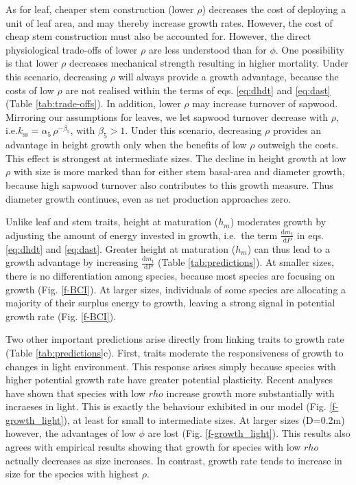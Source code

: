 \documentclass[12pt, a4paper]{article}
\begin{document}
As for leaf, cheaper stem construction (lower \(\rho\)) decreases the
cost of deploying a unit of leaf area, and may thereby increase growth
rates. However, the cost of cheap stem construction must also be
accounted for. However, the direct physiological trade-offs of lower
\(\rho\) are less understood than for \(\phi\). One possibility is that
lower \(\rho\) decreases mechanical strength resulting in higher
mortality\citep{chave_towards_2009,wright_functional_2010}. Under
this scenario, decreasing \(\rho\) will always provide a growth
advantage, because the costs of low \(\rho\) are not realised within the
terms of eqs. \ref{eq:dhdt} and \ref{eq:dast} (Table
\ref{tab:trade-offs}). In addition, lower \(\rho\) may increase turnover
of sapwood. Mirroring our assumptions for leaves, we let sapwood
turnover decrease with \(\rho\),
i.e.\(k_\textrm{ss}=\alpha_5 \, \rho^{-\beta_5}\), with \(\beta_5 > 1\).
Under this scenario, decreasing \(\rho\) provides an advantage in height
growth only when the benefits of low \(\rho\) outweigh the costs. This
effect is strongest at intermediate sizes. The decline in height growth
at low \(\rho\) with size is more marked than for either stem basal-area
and diameter growth, because high sapwood turnover also contributes to
this growth measure. Thus diameter growth continues, even as net
production approaches zero.

Unlike leaf and stem traits, height at maturation (\(h_m\)) moderates
growth by adjusting the amount of energy invested in growth, i.e.~the
term \(\frac{\textrm{d}m_\textrm{t}}{\textrm{d}P}\) in eqs.
\ref{eq:dhdt} and \ref{eq:dast}. Greater height at maturation (\(h_m\))
can thus lead to a growth advantage by increasing
\(\frac{\textrm{d}m_\textrm{t}}{\textrm{d}P}\) (Table
\ref{tab:predictions}). At smaller sizes, there is no differentiation
among species, because most species are focusing on growth (Fig.
\ref{f-BCI}). At larger sizes, individuals of some species are
allocating a majority of their surplus energy to growth, leaving a
strong signal in potential growth rate (Fig. \ref{f-BCI}).

Two other important predictions arise directly from linking traits to
growth rate (Table \ref{tab:predictions}c). First, traits moderate the
responsiveness of growth to changes in light environment. This response
arises simply because species with higher potential growth rate have
greater potential plasticity. Recent analyses have shown that species
with low \(rho\) increase growth more substantially with incraeses in
light\citep{ruger_functional_2012}. This is exactly the behaviour
exhibited in our model (Fig. \ref{f-growth_light}), at least for small
to intermediate sizes. At larger sizes (D=0.2m) however, the advantages
of low \(\phi\) are lost (Fig. \ref{f-growth_light}). This results also
agrees with empirical results showing that growth for species with low
\(rho\) actually decreases as size
increases\citep{ruger_functional_2012}. In contrast, growth rate tends
to increase in size for the species with highest
\(\rho\)\citep{ruger_functional_2012}.
\end{document}
